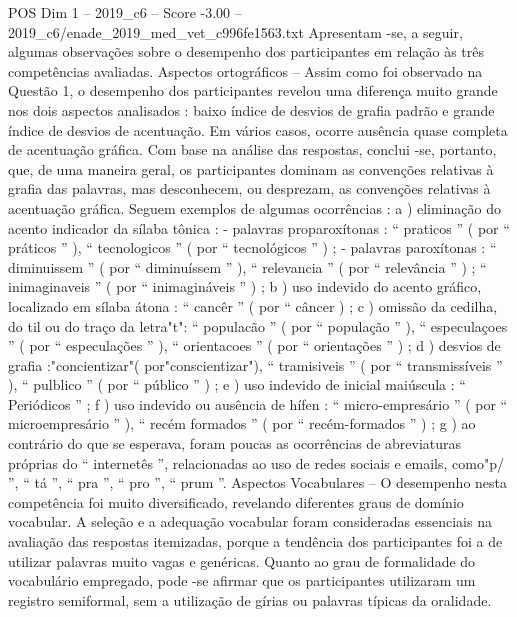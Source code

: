 \begin{textsample}{POS Dim 1 – 2019\_c6 – Score -3.00 – 2019\_c6/enade\_2019\_med\_vet\_c996fe1563.txt}
Apresentam -se, a seguir, algumas observações sobre o desempenho dos participantes em relação às três competências avaliadas.
Aspectos ortográficos – Assim como foi observado na Questão 1, o desempenho dos participantes revelou uma diferença muito grande nos dois aspectos analisados : baixo índice de desvios de grafia padrão e grande índice de desvios de acentuação.
Em vários casos, ocorre ausência quase completa de acentuação gráfica.
Com base na análise das respostas, conclui -se, portanto, que, de uma maneira geral, os participantes dominam as convenções relativas à grafia das palavras, mas desconhecem, ou desprezam, as convenções relativas à acentuação gráfica.
Seguem exemplos de algumas ocorrências : a ) eliminação do acento indicador da sílaba tônica : - palavras proparoxítonas : “ praticos ” ( por “ práticos ” ), “ tecnologicos ” ( por “ tecnológicos ” ) ; - palavras paroxítonas : “ diminuissem ” ( por “ diminuíssem ” ), “ relevancia ” ( por “ relevância ” ) ; “ inimaginaveis ” ( por “ inimagináveis ” ) ; b ) uso indevido do acento gráfico, localizado em sílaba átona : “ cancêr ” ( por “ câncer ) ; c ) omissão da cedilha, do til ou do traço da letra"t": “ populacão ” ( por “ população ” ), “ especulaçoes ” ( por “ especulações ” ), “ orientacoes ” ( por “ orientações ” ) ; d ) desvios de grafia :"concientizar"( por"conscientizar"), “ tramisiveis ” ( por “ transmissíveis ” ), “ pulblico ” ( por “ público ” ) ; e ) uso indevido de inicial maiúscula : “ Periódicos ” ; f ) uso indevido ou ausência de hífen : “ micro-empresário ” ( por “ microempresário ” ), “ recém formados ” ( por “ recém-formados ” ) ; g ) ao contrário do que se esperava, foram poucas as ocorrências de abreviaturas próprias do “ internetês ”, relacionadas ao uso de redes sociais e emails, como"p/ ”, “ tá ”, “ pra ”, “ pro ”, “ prum ”.
Aspectos Vocabulares – O desempenho nesta competência foi muito diversificado, revelando diferentes graus de domínio vocabular.
A seleção e a adequação vocabular foram consideradas essenciais na avaliação das respostas itemizadas, porque a tendência dos participantes foi a de utilizar palavras muito vagas e genéricas.
Quanto ao grau de formalidade do vocabulário empregado, pode -se afirmar que os participantes utilizaram um registro semiformal, sem a utilização de gírias ou palavras típicas da oralidade.

\end{textsample}
